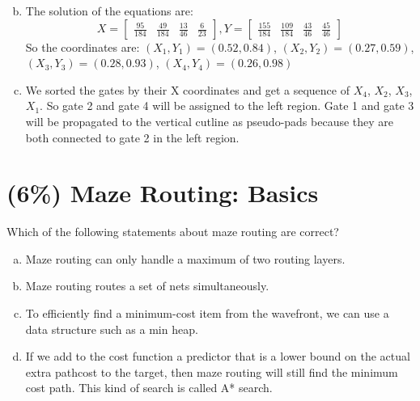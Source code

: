 \documentclass[12pt]{article}
\begin{document}
\begin{enumerate}[(a)]
\[                \]
            \item
                The solution of the equations are:
                \[X=
                    \left[
                        \begin{array}{cccc}
                            \frac{95}{184} & \frac{49}{184} & \frac{13}{46} & \frac{6}{23}
                        \end{array}
                    \right],
                Y=
                    \left[
                        \begin{array}{cccc}
                            \frac{155}{184} & \frac{109}{184} & \frac{43}{46} & \frac{45}{46}
                        \end{array}
                    \right]
                \]
                So the coordinates are: $(X_1, Y_1)=(0.52, 0.84)$, $(X_2, Y_2)=(0.27, 0.59)$,
                $(X_3, Y_3)=(0.28, 0.93)$, $(X_4, Y_4)=(0.26, 0.98)$
            \item
                We sorted the gates by their X coordinates and get a sequence of $X_4$, $X_2$,
                $X_3$, $X_1$. So gate 2 and gate 4 will be assigned to the left region. Gate 1
                and gate 3 will be propagated to the vertical cutline as pseudo-pads because
                they are both connected to gate 2 in the left region.
        \end{enumerate}

    \section{(6\%) Maze Routing: Basics}

        Which of the following statements about maze routing are correct?

        \begin{enumerate}[a)]
            \item Maze routing can only handle a maximum of two routing layers.
            \item Maze routing routes a set of nets simultaneously.
            \item To efficiently find a minimum-cost item from the wavefront, we can use a
                data structure such as a min heap.
            \item If we add to the cost function a predictor that is a lower bound on the
                actual extra pathcost to the target, then maze routing will still find the
                minimum cost path. This kind of search is called A* search.
        \end{enumerate}
\end{document}
